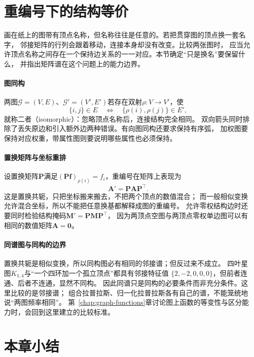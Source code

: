 \section{重编号下的结构等价}
\label{sec:graph-theory-graph-isomorphism}

画在纸上的图带有顶点名称，但名称往往是任意的。若把贯穿图的顶点换一套名字，
邻接矩阵的行列会跟着移动，连接本身却没有改变。比较两张图时，
应当允许顶点名称之间存在一个保持边关系的一一对应。本节确定“只是换名”要保留什么，
并指出矩阵谱在这个问题上的能力边界。

\paragraph{图同构}
两图$\mathcal G=(V,E)$、$\mathcal G'=(V',E')$若存在双射$\rho:V\to V'$，使
\[
  \{i,j\}\in E
  \quad\Longleftrightarrow\quad
  \{\rho(i),\rho(j)\}\in E',
\]
就称二者（isomorphic）：忽略顶点名称后，连接结构完全相同。
双向箭头同时排除了丢失原边和引入额外边两种错误。有向图同构还要求保持有序弧，
加权图要保持对应权重，带属性图则要说明哪些属性也必须保持。

\paragraph{置换矩阵与坐标重排}
设置换矩阵$\bm P$满足$(\bm P\bm f)_{\rho(i)}=f_i$，重编号在矩阵上表现为
\begin{equation}
  \bm A'=\bm P\bm A\bm P^\top.
  \label{eq:graph-theory-adjacency-relabel}
\end{equation}
这是置换共轭，只把坐标搬来搬去，不把两个顶点的数值混合；
而一般相似变换允许混合坐标，所以不能把任意换基都解释成图的重编号。
允许零权结构边时还要同时检验结构掩码$\bm M'=\bm P\bm M\bm P^\top$，
因为两顶点空图与两顶点零权单边图可以有相同的数值矩阵$\bm A=\bm 0$。

\paragraph{同谱图与同构的边界}
置换共轭是相似变换，所以同构图必有相同的邻接谱；但反过来不成立。
四叶星图$K_{1,4}$与“一个四环加一个孤立顶点”都具有邻接特征值
$\{2,-2,0,0,0\}$，但前者连通、后者不连通，显然不同构。
因此同谱只是同构的必要条件而非充分条件。这里比较的是邻接谱；
组合拉普拉斯、归一化拉普拉斯各有自己的谱，不能笼统地说“两图频率相同”。
第~\ref{chap:graph-functions}章讨论图上函数的等变性与区分能力时，会回到这里建立的比较标准。

\section{本章小结}

